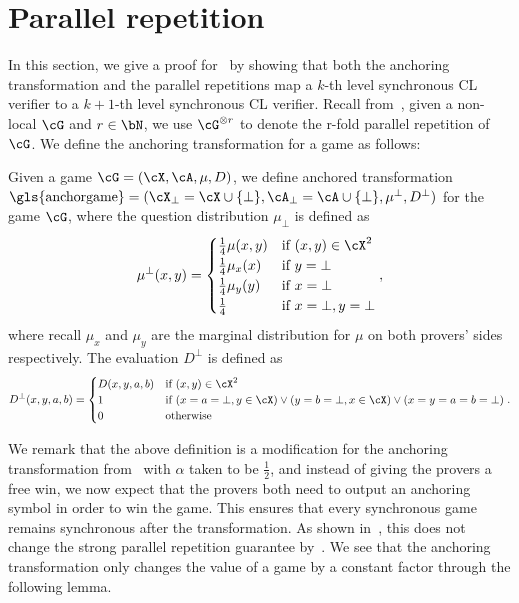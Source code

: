 
\section{Parallel repetition} \label{sec:parallelrep}
In this section, we give a proof for~ by showing that both the anchoring transformation and the parallel repetitions map a $k$-th level synchronous CL verifier to a $k+1$-th level synchronous CL verifier. Recall from~, given a non-local $\cG$ and $r \in \bN$, we use $\cG^{\otimes r}$ to denote the r-fold parallel repetition of $\cG$. We define the anchoring transformation for a game as follows:
\begin{definition} \label{def:anchortransformation}
	Given a game  $\cG = (\cX, \cA, \mu, D)$, we define anchored transformation $\text{\gls{anchorgame}} = (\cX_{\bot} = \cX \cup \{\bot\}, \cA_{\bot} =\cA \cup \{\bot\}, \mu^{\bot}, D^{\bot})$ for the game $\cG$, where the question distribution $\mu_{\bot}$ is defined as 
	\begin{equation*}
		\mu^{\bot}(x,y) = \begin{cases}
			\frac{1}{4} \mu(x,y) & \text{if } (x, y) \in \cX^2 \\
			\frac{1}{4} \mu_x(x) & \text{if } y = \bot \\
			\frac{1}{4} \mu_y(y) & \text{if } x = \bot \\
			\frac{1}{4} & \text{if } x = \bot, y = \bot \\
		\end{cases},
	\end{equation*}
	where recall $\mu_x$ and $\mu_y$ are the marginal distribution for $\mu$ on both provers' sides respectively. The evaluation $D^{\bot}$ is defined as 
\begin{equation*}
	D^{\bot}(x,y,a,b) = \begin{cases}
		D(x,y,a,b) & \text{if } (x, y) \in \cX^2 \\
		1 & \text{if } (x = a = \bot, y \in \cX) \lor (y = b = \bot, x \in \cX) \lor (x = y = a = b = \bot)  \\
		0 & \text{otherwise}
	\end{cases}.
\end{equation*} 
\end{definition}
We remark that the above definition is a modification for the anchoring transformation from~\cite{bavarianAnchoredParallelRepetition2021} with $\alpha$ taken to be $\frac{1}{2}$, and instead of giving the provers a free win, we now expect that the provers both need to output an anchoring symbol in order to win the game. This ensures that every synchronous game remains synchronous after the transformation. As shown in~\cite{jiMIPRE2022a}, this does not change the strong parallel repetition guarantee by~\cite{bavarianAnchoredParallelRepetition2021}. We see that the anchoring transformation only changes the value of a game by a constant factor through the following lemma. 

